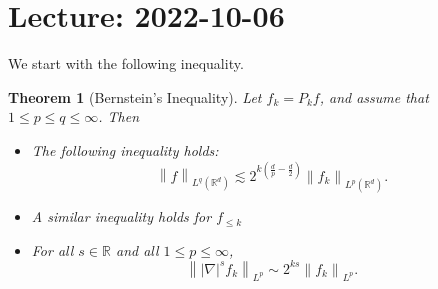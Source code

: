 \documentclass{article}
\newtheorem{theorem}{Theorem}
\def\R{\mathbb{R}} %
\newcommand\norm[1]{\left\lVert#1\right\rVert}
\begin{document}
\section{Lecture: 2022-10-06}
We start with the following inequality.
\begin{theorem}[Bernstein's Inequality]
  \label{thm:bernsteins-inequality-1}
  Let $f_{k}=P_{k}f$, and assume that $1 \leq p \leq q \leq \infty$. Then
  \begin{itemize}[(a)]
    \item The following inequality holds:
    \begin{equation*}
      \norm{f}_{L^{q}(\R^d)} 
      \lesssim 2^{k(\frac{d}{p}-\frac{d}{2})}\norm{f_{k}}_{L^{p}(\R^d)}.
    \end{equation*}
    \item A similar inequality holds for $f_{ \leq k}$
    \item For all $s\in \R$ and all $1 \leq p \leq \infty$,
    \begin{equation*}
      \norm{\left| \nabla \right|^{s}f_{k}}_{L^{p}}\sim 2^{ks}\norm{f_{k}}_{L^{p}}.
    \end{equation*}
  \end{itemize}
\end{theorem}
\end{document}
